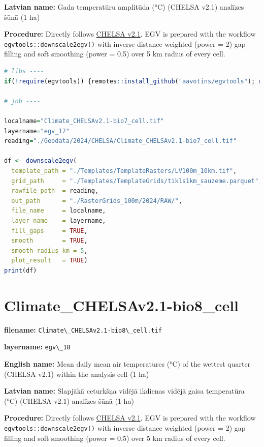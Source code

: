 \documentclass[
]{book}
\newcommand{\passthrough}[1]{#1}
\begin{document}
\textbf{Latvian name:} Gada temperatūru amplitūda (°C) (CHELSA v2.1) analīzes šūnā (1 ha)

\textbf{Procedure:} Directly follows \hyperref[Ch04.11]{CHELSA v2.1}. EGV is prepared with the
workflow \passthrough{\lstinline!egvtools::downscale2egv()!} with inverse distance weighted (power = 2)
gap filling and soft smoothing (power = 0.5) over 5 km radius of every cell.

\begin{lstlisting}[language=R]
# libs ----
if(!require(egvtools)) {remotes::install_github("aavotins/egvtools"); require(egvtools)}

# job ----

localname="Climate_CHELSAv2.1-bio7_cell.tif"
layername="egv_17"
reading="./Geodata/2024/CHELSA/Climate_CHELSAv2.1-bio7_cell.tif"

df <- downscale2egv(
  template_path = "./Templates/TemplateRasters/LV100m_10km.tif",
  grid_path     = "./Templates/TemplateGrids/tikls1km_sauzeme.parquet",
  rawfile_path  = reading,
  out_path      = "./RasterGrids_100m/2024/RAW/",
  file_name     = localname,
  layer_name    = layername,
  fill_gaps     = TRUE,
  smooth        = TRUE,
  smooth_radius_km = 5,
  plot_result   = TRUE)
print(df)
\end{lstlisting}

\section{Climate\_CHELSAv2.1-bio8\_cell}\label{ch06.018}

\textbf{filename:} \passthrough{\lstinline!Climate\_CHELSAv2.1-bio8\_cell.tif!}

\textbf{layername:} \passthrough{\lstinline!egv\_18!}

\textbf{English name:} Mean daily mean air temperatures (°C) of the wettest quarter (CHELSA v2.1) within the analysis cell (1 ha)

\textbf{Latvian name:} Slapjākā ceturkšņa vidējā ikdienas vidējā gaisa temperatūra (°C) (CHELSA v2.1) analīzes šūnā (1 ha)

\textbf{Procedure:} Directly follows \hyperref[Ch04.11]{CHELSA v2.1}. EGV is prepared with the
workflow \passthrough{\lstinline!egvtools::downscale2egv()!} with inverse distance weighted (power = 2)
gap filling and soft smoothing (power = 0.5) over 5 km radius of every cell.
\end{document}
